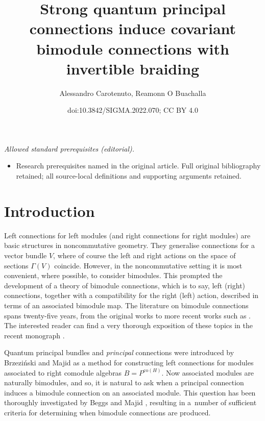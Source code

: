 \documentclass[10pt,a4paper]{amsart}
\title{Strong quantum principal connections induce covariant bimodule connections with invertible braiding}
\author{Alessandro Carotenuto, Reamonn O Buachalla}
\date{doi:10.3842/SIGMA.2022.070; CC BY 4.0}
\numberwithin{equation}{section}
\begin{document}
\maketitle
\noindent\textit{Allowed standard prerequisites (editorial).}\begin{itemize}
\item Research prerequisites named in the original article. Full original bibliography retained; all source-local definitions and supporting arguments retained.
\end{itemize}\medskip
\section{Introduction}

Left connections for left modules (and right connections for right modules) are basic structures in noncommutative geometry. They generalise connections for a vector bundle $V$, where of course the left and right actions on the space of sections $\Gamma(V)$ coincide. However, in the noncommutative setting it is most convenient, where possible, to consider bimodules. This prompted the development of a theory of bimodule connections, which is to say, left (right) connections, together with a compatibility for the right (left) action, described in terms of an associated bimodule map. The literature on bimodule connections spans twenty-five years, from the original works \cite{MdV01, DVMa96, DVMi96, Madore99, MMM95} to more recent works such as \cite{AS14,BM17,BGL20, Aryan2020,M20}. The interested reader can find a very thorough exposition of these topics in the recent monograph \cite{BeggsMajid:Leabh}.

Quantum principal bundles and \emph{principal} connections were introduced by Brzezi\'{n}ski and Majid \cite{TBSM1} as a method for constructing left connections for modules associated to right comodule algebras $B = P^{\textrm{co}(H)}$. Now associated modules are naturally bimodules, and so, it is natural to ask when a principal connection induces a bimodule connection on an associated module. This question has been thoroughly investigated by Beggs and Majid \cite[Section~5.4]{BeggsMajid:Leabh}, resulting in a~number of sufficient criteria for determining when bimodule connections are produced.
\end{document}
